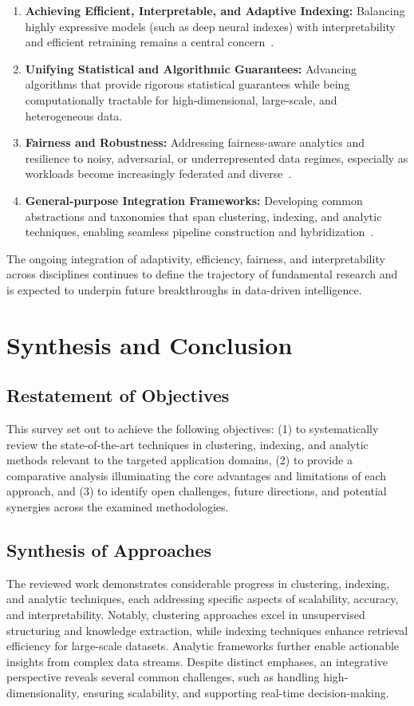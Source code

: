 \documentclass[sigconf]{acmart}
\begin{document}
\begin{enumerate}
    \item\textbf{Achieving Efficient, Interpretable, and Adaptive Indexing:} Balancing highly expressive models (such as deep neural indexes) with interpretability and efficient retraining remains a central concern~\cite{ref110,ref115,ref111}.
    \item\textbf{Unifying Statistical and Algorithmic Guarantees:} Advancing algorithms that provide rigorous statistical guarantees while being computationally tractable for high-dimensional, large-scale, and heterogeneous data.
    \item\textbf{Fairness and Robustness:} Addressing fairness-aware analytics and resilience to noisy, adversarial, or underrepresented data regimes, especially as workloads become increasingly federated and diverse~\cite{ref116,ref117}.
    \item\textbf{General-purpose Integration Frameworks:} Developing common abstractions and taxonomies that span clustering, indexing, and analytic techniques, enabling seamless pipeline construction and hybridization~\cite{ref110}.
\end{enumerate}

The ongoing integration of adaptivity, efficiency, fairness, and interpretability across disciplines continues to define the trajectory of fundamental research and is expected to underpin future breakthroughs in data-driven intelligence.

\section{Synthesis and Conclusion}

\subsection{Restatement of Objectives}
This survey set out to achieve the following objectives: (1) to systematically review the state-of-the-art techniques in clustering, indexing, and analytic methods relevant to the targeted application domains, (2) to provide a comparative analysis illuminating the core advantages and limitations of each approach, and (3) to identify open challenges, future directions, and potential synergies across the examined methodologies.

\subsection{Synthesis of Approaches}
The reviewed work demonstrates considerable progress in clustering, indexing, and analytic techniques, each addressing specific aspects of scalability, accuracy, and interpretability. Notably, clustering approaches excel in unsupervised structuring and knowledge extraction, while indexing techniques enhance retrieval efficiency for large-scale datasets. Analytic frameworks further enable actionable insights from complex data streams. Despite distinct emphases, an integrative perspective reveals several common challenges, such as handling high-dimensionality, ensuring scalability, and supporting real-time decision-making.
\end{document}
